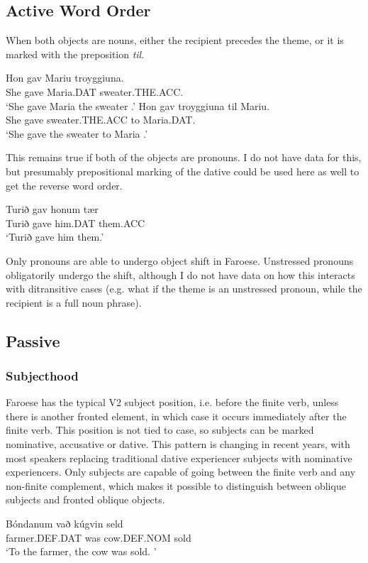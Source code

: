 \subsection{Active Word Order}
When both objects are nouns, either the recipient precedes the theme, or it is marked with the preposition \emph{til}.
\begin{exe}
\ex 
\begin{xlist}
\ex \gll Hon gav Mariu troyggiuna.\\
She gave Maria.DAT sweater.THE.ACC.\\
\trans `She gave Maria the sweater \citep{Lundquist.2013b}.'
\ex \gll Hon gav troyggiuna til Mariu.\\
She gave sweater.THE.ACC to Maria.DAT.\\
\trans `She gave the sweater to Maria \citep{Lundquist.2013b}.'
\end{xlist}
\end{exe}
This remains true if both of the objects are pronouns. I do not have data for this, but presumably prepositional marking of the dative could be used here as well to get the reverse word order.
\begin{exe}
\ex \gll Turið gav honum t\ae r\\
Turið gave him.DAT them.ACC\\
\trans `Turið gave him them.'
\end{exe}
Only pronouns are able to undergo object shift in Faroese. Unstressed pronouns obligatorily undergo the shift, although I do not have data on how this interacts with ditransitive cases (e.g. what if the theme is an unstressed pronoun, while the recipient is a full noun phrase).
\subsection{Passive}
\subsubsection{Subjecthood}
Faroese has the typical V2 subject position, i.e. before the finite verb, unless there is another fronted element, in which case it occurs immediately after the finite verb. This position is not tied to case, so subjects can be marked nominative, accusative or dative. This pattern is changing in recent years, with most speakers replacing traditional dative experiencer subjects with nominative experiencers. Only subjects are capable of going between the finite verb and any non-finite complement, which makes it possible to distinguish between oblique subjects and fronted oblique objects.
\begin{exe}
\ex \gll Bóndanum vað kúgvin seld\\
farmer.DEF.DAT was cow.DEF.NOM sold\\
\trans `To the farmer, the cow was sold. \cite[ft. 47]{Hoskuldurrainsson.2004}'
\end{exe}
